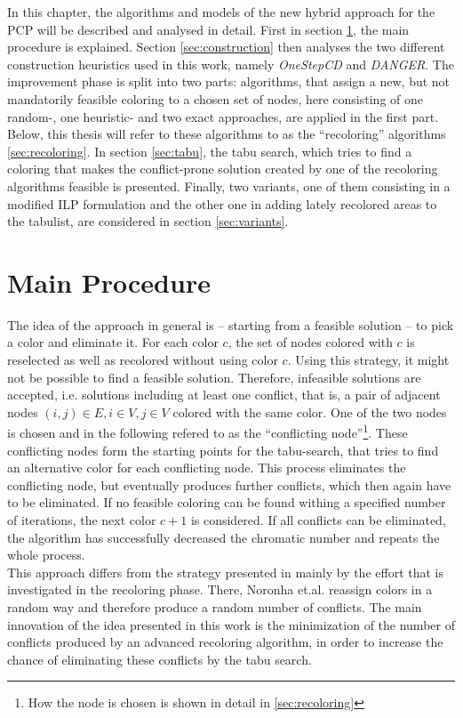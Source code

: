 In this chapter, the algorithms and models of the new hybrid approach for the PCP will be described and analysed in detail. First in section \ref{sec:mainalg}, the main procedure is explained. Section \ref{sec:construction} then analyses the two different construction heuristics used in this work, namely \textit{OneStepCD} and \textit{DANGER}. The improvement phase is split into two parts: algorithms, that assign a new, but not mandatorily feasible coloring to a chosen set of nodes, here consisting of one random-, one heuristic- and two exact approaches, are applied in the first part. Below, this thesis will refer to these algorithms to as the ``recoloring'' algorithms \ref{sec:recoloring}. In section \ref{sec:tabu}, the tabu search, which tries to find a coloring that makes the conflict-prone solution created by one of the recoloring algorithms feasible is presented. Finally, two variants, one of them consisting in a modified ILP formulation and the other one in adding lately recolored areas to the tabulist, are considered in section \ref{sec:variants}.

\section{Main Procedure}
\label{sec:mainalg}

The idea of the approach in general is -- starting from a feasible solution -- to pick a color and eliminate it. For each color $c$, the set of nodes colored with $c$ is reselected as well as recolored without using color $c$. Using this strategy, it might not be possible to find a feasible solution. Therefore, infeasible solutions are accepted, i.e. solutions including at least one conflict, that is, a pair of adjacent nodes $(i,j)\in E, i \in V, j\in V$ colored with the same color. One of the two nodes is chosen and in the following refered to as the ``conflicting node''\footnote{How the node is chosen is shown in detail in \ref{sec:recoloring}}. These conflicting nodes form the starting points for the tabu-search, that tries to find an alternative color for each conflicting node. This process eliminates the conflicting node, but eventually produces further conflicts, which then again have to be eliminated. If no feasible coloring can be found withing a specified number of iterations, the next color $c+1$ is considered. If all conflicts can be eliminated, the algorithm has successfully decreased the chromatic number and repeats the whole process.\\
This approach differs from the strategy presented in \cite{noronha-06} mainly by the effort that is investigated in the recoloring phase. There, Noronha et.al. reassign colors in a random way and therefore produce a random number of conflicts. The main innovation of the idea presented in this work is the minimization of the number of conflicts produced by an advanced recoloring algorithm, in order to increase the chance of eliminating these conflicts by the tabu search.\\

